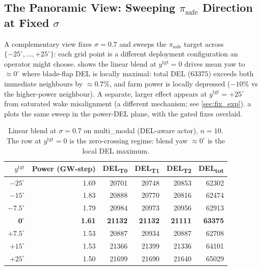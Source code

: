 \documentclass{article}
\begin{document}
\subsection{The Panoramic View: Sweeping \texorpdfstring{$\pi_{\mathrm{safe}}$}{pi-safe} Direction at Fixed \texorpdfstring{$\sigma$}{sigma}}
\label{sec:hazard_wf}

A complementary view fixes $\sigma=0.7$ and sweeps the $\pi_{\mathrm{safe}}$ target across $\{-25^\circ, \ldots, +25^\circ\}$: each grid point is a different deployment configuration an operator might choose.
 shows the linear blend at $y^{\mathrm{tgt}}=0$ drives mean yaw to $\approx 0^\circ$ where blade-flap DEL is locally maximal: total DEL ($63375$) exceeds both immediate neighbours by $\approx 0.7\%$, and farm power is locally depressed ($-10\%$ vs the higher-power neighbour).
A separate, larger effect appears at $y^{\mathrm{tgt}}=+25^\circ$ from saturated wake misalignment (a different mechanism; see \cref{sec:fix_exp}).
a plots the same sweep in the power-DEL plane, with the gated fixes overlaid.

\begin{table}[h]
\centering
\caption{Linear blend at $\sigma=0.7$ on multi\_modal (DEL-aware actor), $n=10$. The row at $y^{\mathrm{tgt}}=0$ is the zero-crossing regime: blend yaw $\approx 0^\circ$ is the local DEL maximum.}
\label{tab:linear_hazard_mm}
\small
\begin{tabular}{rrrrrr}
\toprule
$y^{\mathrm{tgt}}$ & Power (GW-step) & DEL\textsubscript{T0} & DEL\textsubscript{T1} & DEL\textsubscript{T2} & DEL\textsubscript{tot} \\
\midrule
$-25^\circ$ & 1.69 & 20701 & 20748 & 20853 & 62302 \\
$-15^\circ$ & 1.83 & 20888 & 20770 & 20816 & 62474 \\
$-7.5^\circ$ & 1.79 & 20984 & 20973 & 20956 & 62913 \\
$\mathbf{0^\circ}$ & \textbf{1.61} & \textbf{21132} & \textbf{21132} & \textbf{21111} & \textbf{63375} \\
$+7.5^\circ$ & 1.53 & 20887 & 20934 & 20887 & 62708 \\
$+15^\circ$ & 1.53 & 21366 & 21399 & 21336 & 64101 \\
$+25^\circ$ & 1.50 & 21699 & 21690 & 21640 & 65029 \\
\bottomrule
\end{tabular}
\end{table}
\end{document}
